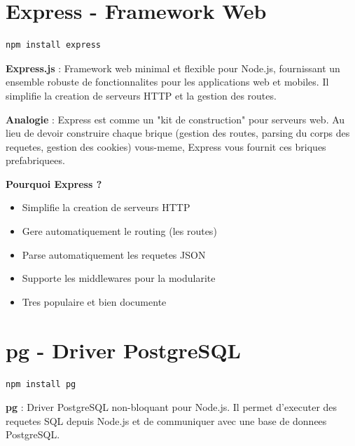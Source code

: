 \documentclass[a4paper,12pt]{book}
\begin{document}
\section{Express - Framework Web}

\begin{lstlisting}[style=bash, caption=Installation d'Express]
npm install express
\end{lstlisting}

\begin{definitionbox}
    \textbf{Express.js} : Framework web minimal et flexible pour Node.js, fournissant un ensemble robuste de fonctionnalites pour les applications web et mobiles. Il simplifie la creation de serveurs HTTP et la gestion des routes.
\end{definitionbox}

\begin{analogybox}
    \textbf{Analogie} : Express est comme un "kit de construction" pour serveurs web. Au lieu de devoir construire chaque brique (gestion des routes, parsing du corps des requetes, gestion des cookies) vous-meme, Express vous fournit ces briques prefabriquees.
\end{analogybox}

\textbf{Pourquoi Express ?}
\begin{itemize}
    \item Simplifie la creation de serveurs HTTP
    \item Gere automatiquement le routing (les routes)
    \item Parse automatiquement les requetes JSON
    \item Supporte les middlewares pour la modularite
    \item Tres populaire et bien documente
\end{itemize}

\section{pg - Driver PostgreSQL}

\begin{lstlisting}[style=bash, caption=Installation du driver pg]
npm install pg
\end{lstlisting}

\begin{definitionbox}
    \textbf{pg} : Driver PostgreSQL non-bloquant pour Node.js. Il permet d'executer des requetes SQL depuis Node.js et de communiquer avec une base de donnees PostgreSQL.
\end{definitionbox}
\end{document}
